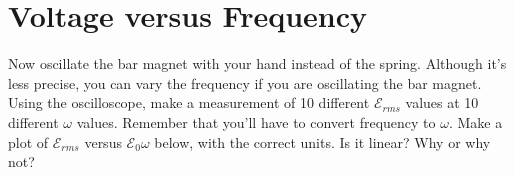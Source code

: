 \documentclass[12pt]{article}
\begin{document}
\section{Voltage versus Frequency}

Now oscillate the bar magnet with your hand instead of the spring.  Although it's less precise, you can vary the frequency if you are oscillating the bar magnet.  Using the oscilloscope, make a measurement of 10 different $\mathcal{E}_{rms}$ values at 10 different $\omega$ values.  Remember that you'll have to convert frequency to $\omega$.  Make a plot of $\mathcal{E}_{rms}$ versus $\mathcal{E}_0 \omega$ below, with the correct units.  Is it linear?  Why or why not?\\ \vspace{3cm}
\end{document}

